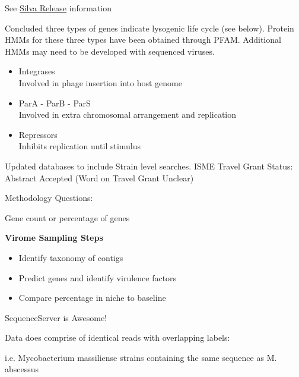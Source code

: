\documentclass[idxtotoc,hyperref,openany]{labbook} %
\begin{document}
See \href{https://www.arb-silva.de/documentation/release-132/}{Silva Release} information




Concluded three types of genes indicate lysogenic life cycle (see below). Protein HMMs for these three types have been obtained through PFAM. Additional HMMs may need to be developed with sequenced viruses. 

\begin{itemize}
\item Integrases \\
Involved in phage insertion into host genome
\item ParA - ParB - ParS \\
Involved in extra chromosomal arrangement and replication
\item Repressors \\
Inhibits replication until stimulus 
\end{itemize}




Updated databases to include Strain level searches. ISME Travel Grant Status: Abstract Accepted (Word on Travel Grant Unclear)



Methodology Questions: 

Gene count or percentage of genes

\textbf{Virome Sampling Steps}

\begin{itemize}
\item Identify taxonomy of contigs
\item Predict genes and identify virulence factors
\item Compare percentage in niche to baseline
\end{itemize}



SequenceServer is Awesome!

Data does comprise of identical reads with overlapping labels:

i.e. Mycobacterium massiliense strains containing the same sequence as M. abscessus

\end{document}
